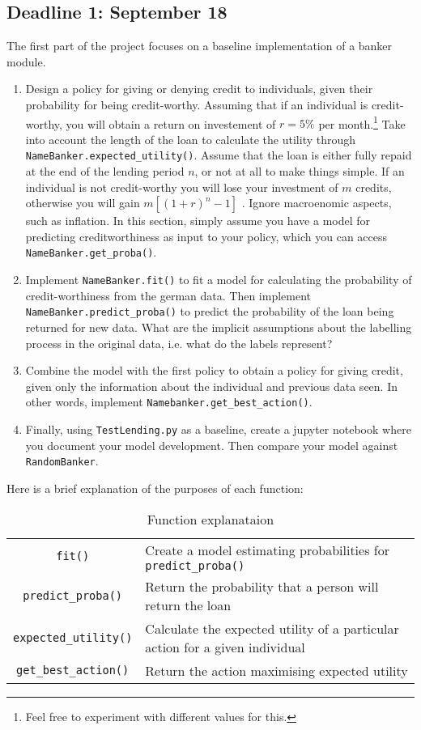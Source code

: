 \subsection{Deadline 1: September 18}
The first part of the project focuses on a baseline implementation of a banker module.
\begin{enumerate}
\item Design a policy for giving or denying credit to individuals, given their probability for being credit-worthy. Assuming that if an individual is credit-worthy, you will obtain a return on investement of $r = 5\%$ per month.\footnote{Feel free to experiment with different values for this.} Take into account the length of the loan to calculate the utility through \verb|NameBanker.expected_utility()|. Assume that the loan is either fully repaid at the end of the lending period $n$, or not at all to make things simple. If an individual is not credit-worthy you will lose your investment of $m$ credits, otherwise you will gain $m [(1 + r)^{n} - 1]$ . Ignore macroenomic aspects, such as inflation. In this section, simply assume you have a model for predicting creditworthiness as input to your policy, which you can access \verb|NameBanker.get_proba()|. 
\item Implement \verb|NameBanker.fit()| to fit a model for calculating the probability of credit-worthiness from the german data. Then implement \verb|NameBanker.predict_proba()| to predict the probability of the loan being returned for new data. What are the implicit assumptions about the labelling process in the original data, i.e. what do the labels represent?
\item Combine the model with the first policy to obtain a policy for giving credit, given only the information about the individual and previous data seen. In other words, implement \verb|Namebanker.get_best_action()|.
\item Finally, using \verb|TestLending.py| as a baseline, create a jupyter notebook where you document your model development. Then compare your model against \verb|RandomBanker|.
\end{enumerate}
Here is a brief explanation of the purposes of each function:
\begin{table}[H]
  \centering
  \begin{tabular}{c|l}
    \verb|fit()| & Create a model estimating probabilities for \verb|predict_proba()|\\
  \verb|predict_proba()| & Return the probability that a person will return the loan\\
  \verb|expected_utility()| & Calculate the expected utility of a particular action for a given individual\\
  \verb|get_best_action()| & Return the action maximising expected utility
\end{tabular}

\caption{Function explanataion}
\label{tab:functions}
\end{table}
